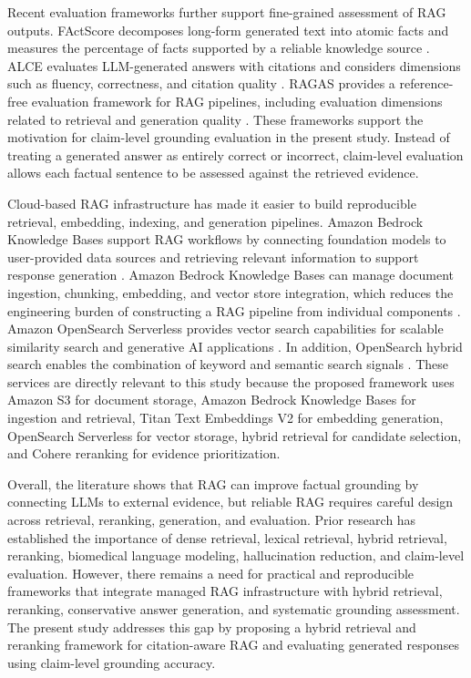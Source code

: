 Recent evaluation frameworks further support fine-grained assessment of RAG outputs. FActScore decomposes long-form generated text into atomic facts and measures the percentage of facts supported by a reliable knowledge source \cite{min2023factscore}. ALCE evaluates LLM-generated answers with citations and considers dimensions such as fluency, correctness, and citation quality \cite{gao2023alce}. RAGAS provides a reference-free evaluation framework for RAG pipelines, including evaluation dimensions related to retrieval and generation quality \cite{es2024ragas}. These frameworks support the motivation for claim-level grounding evaluation in the present study. Instead of treating a generated answer as entirely correct or incorrect, claim-level evaluation allows each factual sentence to be assessed against the retrieved evidence.

Cloud-based RAG infrastructure has made it easier to build reproducible retrieval, embedding, indexing, and generation pipelines. Amazon Bedrock Knowledge Bases support RAG workflows by connecting foundation models to user-provided data sources and retrieving relevant information to support response generation \cite{awsbedrockkb}. Amazon Bedrock Knowledge Bases can manage document ingestion, chunking, embedding, and vector store integration, which reduces the engineering burden of constructing a RAG pipeline from individual components \cite{awsbedrockworkflow}. Amazon OpenSearch Serverless provides vector search capabilities for scalable similarity search and generative AI applications \cite{opensearchserverless}. In addition, OpenSearch hybrid search enables the combination of keyword and semantic search signals \cite{opensearchhybrid}. These services are directly relevant to this study because the proposed framework uses Amazon S3 for document storage, Amazon Bedrock Knowledge Bases for ingestion and retrieval, Titan Text Embeddings V2 for embedding generation, OpenSearch Serverless for vector storage, hybrid retrieval for candidate selection, and Cohere reranking for evidence prioritization.

Overall, the literature shows that RAG can improve factual grounding by connecting LLMs to external evidence, but reliable RAG requires careful design across retrieval, reranking, generation, and evaluation. Prior research has established the importance of dense retrieval, lexical retrieval, hybrid retrieval, reranking, biomedical language modeling, hallucination reduction, and claim-level evaluation. However, there remains a need for practical and reproducible frameworks that integrate managed RAG infrastructure with hybrid retrieval, reranking, conservative answer generation, and systematic grounding assessment. The present study addresses this gap by proposing a hybrid retrieval and reranking framework for citation-aware RAG and evaluating generated responses using claim-level grounding accuracy.